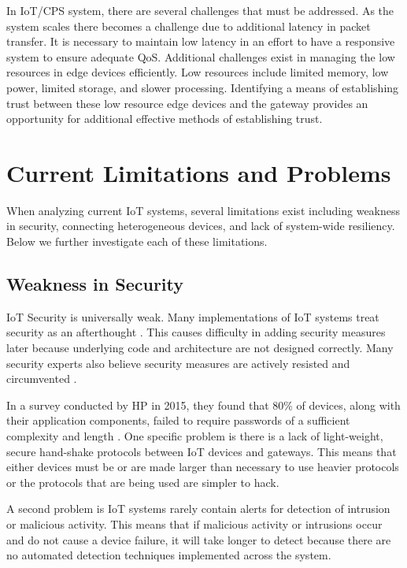 \documentclass[../main.tex]{subfiles}
\begin{document}

In IoT/CPS system, there are several challenges that must be addressed. As the system scales there becomes a challenge due to additional latency in packet transfer. It is necessary to maintain low latency in an effort to have a responsive system to ensure adequate QoS. Additional challenges exist in managing the low resources in edge devices efficiently. Low resources include limited memory, low power, limited storage, and slower processing. Identifying a means of establishing trust between these low resource edge devices and the gateway provides an opportunity for additional effective methods of establishing trust.


\section{Current Limitations and Problems}

When analyzing current IoT systems, several limitations exist including weakness in security, connecting heterogeneous devices, and lack of system-wide resiliency. Below we further investigate each of these limitations. 


\subsection{Weakness in Security}
IoT Security is universally weak. Many implementations of IoT systems treat security as an afterthought \cite{techcruch-security}. This causes difficulty in adding security measures later because underlying code and architecture are not designed correctly. Many security experts also believe security measures are actively resisted and circumvented \cite{techcruch-security}.

In a survey conducted by HP in 2015, they found that 80\% of devices, along with their application components, failed to require passwords of a sufficient complexity and length \cite{hp-security}. One specific problem is there is a lack of light-weight, secure hand-shake protocols between IoT devices and gateways. This means that either devices must be or are made larger than necessary to use heavier protocols or the protocols that are being used are simpler to hack.

A second problem is IoT systems rarely contain alerts for detection of intrusion or malicious activity. This means that if malicious activity or intrusions occur and do not cause a device failure, it will take longer to detect because there are no automated detection techniques implemented across the system. 
\end{document}
